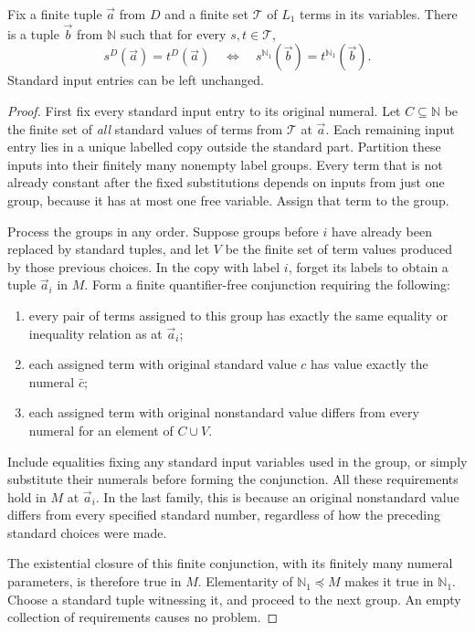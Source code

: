 \begin{lemma}
\label{lem:amalgam-diagram}
Fix a finite tuple $\vec a$ from $D$ and a finite set $\mathcal T$
of $L_1$ terms in its variables. There is a tuple $\vec b$ from
$\mathbb N$ such that for every $s,t\in\mathcal T$,
\[
          s^D(\vec a)=t^D(\vec a)
          \quad\Longleftrightarrow\quad
          s^{\mathbb N_1}(\vec b)=t^{\mathbb N_1}(\vec b).
 \tag{FD}\label{eq:amalgam-finite-diagram}
\]
Standard input entries can be left unchanged.
\end{lemma}
\begin{proof}
First fix every standard input entry to its original numeral. Let
$C\subseteq\mathbb N$ be the finite set of \emph{all} standard
values of terms from $\mathcal T$ at $\vec a$. Each remaining
input entry lies in a unique labelled copy outside the standard part.
Partition these inputs into their finitely many nonempty label groups.
Every term that is not already constant after the fixed substitutions
depends on inputs from just one group, because it has at most one
free variable. Assign that term to the group.

Process the groups in any order. Suppose groups before $i$ have
already been replaced by standard tuples, and let $V$ be the finite
set of term values produced by those previous choices. In the copy
with label $i$, forget its labels to obtain a tuple $\vec a_i$ in
$M$. Form a finite quantifier-free conjunction requiring the following:
\begin{enumerate}
\item every pair of terms assigned to this group has exactly the
same equality or inequality relation as at $\vec a_i$;
\item each assigned term with original standard value $c$ has value
exactly the numeral $\bar c$;
\item each assigned term with original nonstandard value differs from
every numeral for an element of $C\cup V$.
\end{enumerate}
Include equalities fixing any standard input variables used in the
group, or simply substitute their numerals before forming the conjunction.
All these requirements hold in $M$ at $\vec a_i$. In the last
family, this is because an original nonstandard value differs from
every specified standard number, regardless of how the preceding
standard choices were made.

The existential closure of this finite conjunction, with its finitely
many numeral parameters, is therefore true in $M$. Elementarity of
$\mathbb N_1\preccurlyeq M$ makes it true in $\mathbb N_1$.
Choose a standard tuple witnessing it, and proceed to the next group.
An empty collection of requirements causes no problem.


\end{proof}
